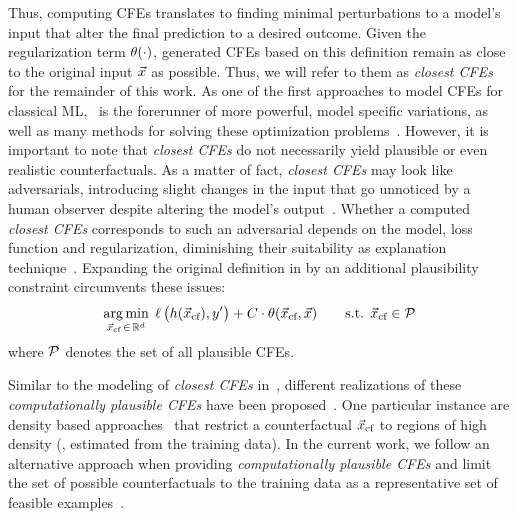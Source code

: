 Thus, computing \glspl{CFE} translates to finding minimal perturbations to a model's input that alter the final prediction to a desired outcome. Given the regularization term $\operatorname*{{\theta}}(\cdot)$, generated \glspl{CFE} based on this definition remain as close to the original input $\vec{x}$ as possible. 
Thus, we will refer to them as \textit{closest \glspl{CFE}} for the remainder of this work.
As one of the first approaches to model \glspl{CFE} for classical \gls{ML},~ is the forerunner of more powerful, model specific variations, as well as many methods for solving these optimization problems~\citep{verma_counterfactual_2020,artelt_computation_2019,karimi_survey_2020}.
However, it is important to note that \textit{closest \glspl{CFE}} do not necessarily yield plausible or even realistic counterfactuals.
As a matter of fact, \textit{closest \glspl{CFE}} may look like adversarials, introducing slight changes in the input that go unnoticed by a human observer despite altering the model's output~\citep{papernot_practical_2017}. 
Whether a computed \textit{closest \glspl{CFE}} corresponds to such an adversarial depends on the model, loss function and regularization, diminishing their suitability as explanation technique~\citep{laugel_issues_2019}.
Expanding the original definition in  by an additional plausibility constraint circumvents these issues:
\begin{equation}
\begin{split}
\underset{{\vec{x}_{\text{cf}}} \,\in\, \mathbb{R}^d}{\arg\min}\; \operatorname*{{\ell}}\big(h({\vec{x}_{\text{cf}}}), y'\big) + C \cdot \operatorname*{{\theta}}({\vec{x}_{\text{cf}}}, \vec{x}) \quad\quad \text{s.t. } {\vec{x}_{\text{cf}}} \in \mathcal{P}
\end{split}
\end{equation}
where $\mathcal{P}$ denotes the set of all plausible \glspl{CFE}.

Similar to the modeling of \textit{closest \glspl{CFE}} in~, different realizations of these \textit{computationally plausible \glspl{CFE}} have been proposed~\citep{looveren_interpretable_2019,poyiadzi_face_2019,artelt_convex_2020}. One particular instance are density based approaches~\citep{artelt_convex_2020} that restrict a counterfactual ${\vec{x}_{\text{cf}}}$ to regions of high density (\eg, estimated from the training data).
In the current work, we follow an alternative approach when providing \textit{computationally plausible \glspl{CFE}} and limit the set of possible counterfactuals to the training data as a representative set of feasible examples~\citep{poyiadzi_face_2019}.

